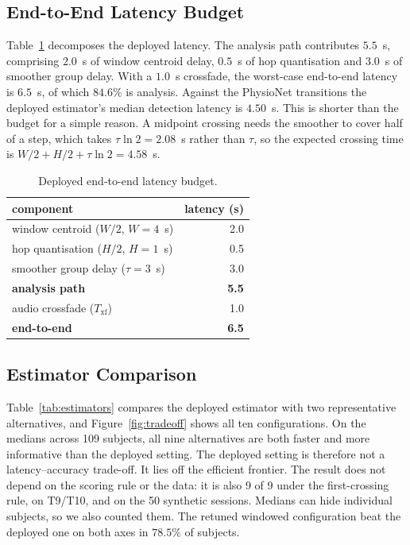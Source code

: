 \documentclass[11pt,a4paper]{article}
\begin{document}
\subsection{End-to-End Latency Budget}

Table~\ref{tab:budget} decomposes the deployed latency. The analysis path contributes
$5.5$~s, comprising $2.0$~s of window centroid delay, $0.5$~s of hop quantisation and
$3.0$~s of smoother group delay. With a $1.0$~s crossfade, the worst-case end-to-end
latency is $6.5$~s, of which $84.6\%$ is analysis. Against the PhysioNet transitions the
deployed estimator's median detection latency is $4.50$~s. This is shorter than the budget
for a simple reason. A midpoint crossing needs the smoother to cover half of a step, which
takes $\tau \ln 2 = 2.08$~s rather than $\tau$, so the expected crossing time is
$W/2 + H/2 + \tau\ln 2 = 4.58$~s.

\begin{table}[h]
\centering
\caption{Deployed end-to-end latency budget.}
\label{tab:budget}
\begin{tabular}{lr}
\toprule
component & latency (s) \\
\midrule
window centroid ($W/2$, $W = 4$~s) & 2.0 \\
hop quantisation ($H/2$, $H = 1$~s) & 0.5 \\
smoother group delay ($\tau = 3$~s) & 3.0 \\
\textbf{analysis path} & \textbf{5.5} \\
audio crossfade ($T_{\mathrm{xf}}$) & 1.0 \\
\textbf{end-to-end} & \textbf{6.5} \\
\bottomrule
\end{tabular}
\end{table}

\subsection{Estimator Comparison}

Table~\ref{tab:estimators} compares the deployed estimator with two representative
alternatives, and Figure~\ref{fig:tradeoff} shows all ten configurations. On the medians
across 109 subjects, all nine alternatives are both faster and more informative than the
deployed setting. The deployed setting is therefore not a latency--accuracy trade-off. It
lies off the efficient frontier. The result does not depend on the scoring rule or the
data: it is also 9 of 9 under the first-crossing rule, on T9/T10, and on the 50 synthetic
sessions. Medians can hide individual subjects, so we also counted them. The retuned
windowed configuration beat the deployed one on both axes in $78.5\%$ of subjects.
\end{document}

